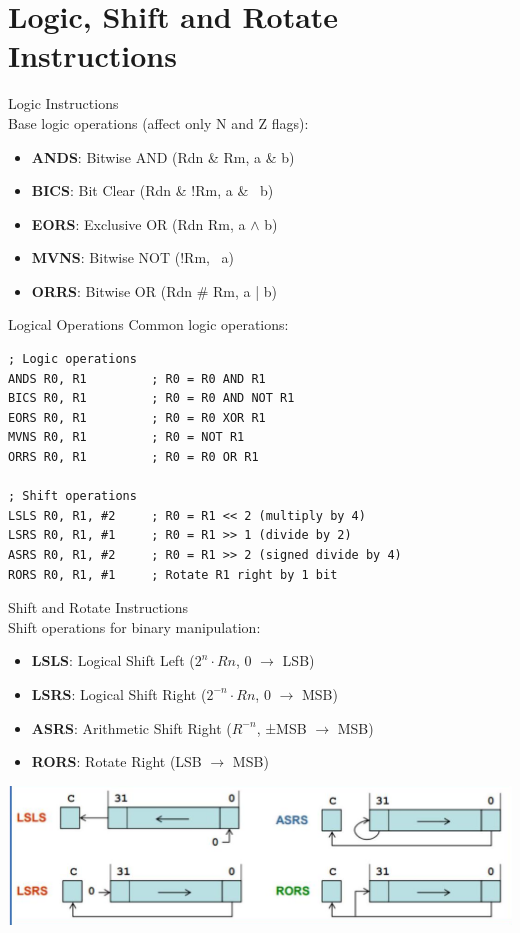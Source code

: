 \section{Logic, Shift and Rotate Instructions}

\begin{concept}{Logic Instructions}\\
Base logic operations (affect only N and Z flags):
\begin{itemize}
  \item \textbf{ANDS}: Bitwise AND (Rdn \& Rm, a \& b)
  \item \textbf{BICS}: Bit Clear (Rdn \& !Rm, a \& ~b)
  \item \textbf{EORS}: Exclusive OR (Rdn \textdollar Rm, a $\wedge$  b)
  \item \textbf{MVNS}: Bitwise NOT (!Rm, ~a)
  \item \textbf{ORRS}: Bitwise OR (Rdn \# Rm, a | b)
\end{itemize}
\end{concept}

\begin{example2}{Logical Operations}
Common logic operations:
\begin{lstlisting}[language=armasm, style=basesmol]
; Logic operations
ANDS R0, R1         ; R0 = R0 AND R1
BICS R0, R1         ; R0 = R0 AND NOT R1
EORS R0, R1         ; R0 = R0 XOR R1
MVNS R0, R1         ; R0 = NOT R1
ORRS R0, R1         ; R0 = R0 OR R1

; Shift operations
LSLS R0, R1, #2     ; R0 = R1 << 2 (multiply by 4)
LSRS R0, R1, #1     ; R0 = R1 >> 1 (divide by 2)
ASRS R0, R1, #2     ; R0 = R1 >> 2 (signed divide by 4)
RORS R0, R1, #1     ; Rotate R1 right by 1 bit
\end{lstlisting}
\end{example2}

\begin{concept}{Shift and Rotate Instructions}\\
Shift operations for binary manipulation:
\begin{itemize}
  \item \textbf{LSLS}: Logical Shift Left ($2^n \cdot Rn$, 0 $\rightarrow$ LSB)
  \item \textbf{LSRS}: Logical Shift Right ($2^{-n} \cdot Rn$, 0 $\rightarrow$ MSB)
  \item \textbf{ASRS}: Arithmetic Shift Right ($R^{-n}$, ±MSB $\rightarrow$ MSB)
  \item \textbf{RORS}: Rotate Right (LSB $\rightarrow$ MSB)
\end{itemize}

\includegraphics[width=\linewidth]{images/2024_12_29_79e6b22f503fb7b4f718g-06}
\end{concept}

